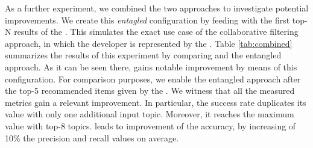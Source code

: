 As a further experiment, we combined the two approaches to investigate potential improvements. We create this \emph{entagled} configuration by feeding \CT with the first top-N results of the \MNB. This simulates the exact use case of the collaborative filtering approach, in which the developer is represented by the \MNB. Table \ref{tab:combined} summarizes the results of this experiment by comparing \CT and the entangled approach. As it can be seen there, \CT gains notable improvement by means of this configuration. For comparison purposes, we enable the entangled approach after the top-5 recommended items given by the \MNB. We witness that all the measured metrics gain a relevant improvement. In particular, the success rate duplicates its value with only one additional input topic. Moreover, it reaches the maximum value with top-8 topics.  \CT leads to improvement of the \MNB accuracy, by increasing of 10\% the precision and recall values on average. 



